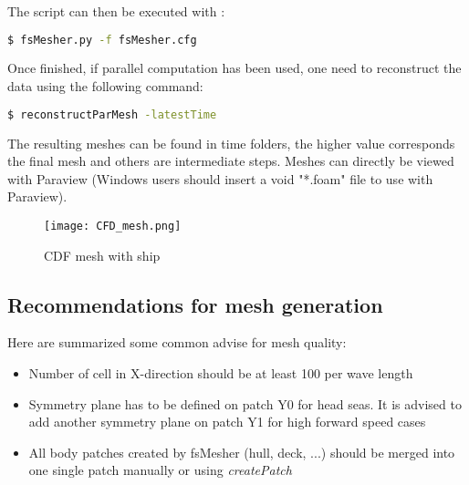 The script can then be executed with :
\begin{lstlisting}[language=bash]
$ fsMesher.py -f fsMesher.cfg
\end{lstlisting}

Once finished, if parallel computation has been used, one need to reconstruct the data using the following command:
\begin{lstlisting}[language=bash]
$ reconstructParMesh -latestTime
\end{lstlisting}

The resulting meshes can be found in time folders, the higher value corresponds the final mesh and others are intermediate steps. Meshes can directly be viewed with Paraview (Windows users should insert a void "*.foam" file to use with Paraview).

\begin{figure}[htbp]
\begin{center}
\texttt{[image: CFD\_mesh.png]}
\end{center}
\caption{CDF mesh with ship}
\label{cfd_mesh} 
\end{figure}


\subsection{Recommendations for mesh generation}

Here are summarized some common advise for mesh quality:
\begin{itemize}
\item Number of cell in X-direction should be at least 100 per wave length
\item Symmetry plane has to be defined on patch Y0 for head seas. It is advised to add another symmetry plane on patch Y1 for high forward speed cases
\item All body patches created by fsMesher (hull, deck, ...) should be merged into one single patch manually or using \emph{createPatch}
\end{itemize}